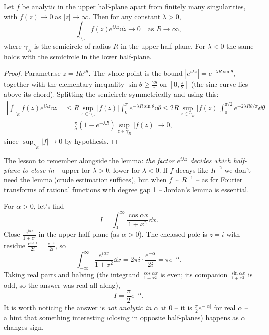 \documentclass[a4paper]{scrartcl}
\begin{document}
\begin{lemma}
	Let $f$ be analytic in the upper half-plane apart from finitely many singularities, with $f(z) \to 0$ as $|z| \to \infty$. Then for any constant $\lambda > 0$,
	$$
	\int_{\gamma_R} f(z) e^{i\lambda z} \dd z \to 0 \quad \text{as } R \to \infty,
	$$
	where $\gamma_R$ is the semicircle of radius $R$ in the upper half-plane. For $\lambda < 0$ the same holds with the semicircle in the lower half-plane.
\end{lemma}
\begin{proof}
	Parametrise $z = Re^{i\theta}$. The whole point is the bound $|e^{i\lambda z}| = e^{-\lambda R \sin\theta}$, together with the elementary inequality $\sin\theta \geq \frac{2\theta}{\pi}$ on $[0, \frac{\pi}{2}]$ (the sine curve lies above its chord). Splitting the semicircle symmetrically and using this:
	\begin{align*}
		\left|\int_{\gamma_R} f(z) e^{i\lambda z} \dd z\right|
		&\leq R \sup_{z \in \gamma_R}|f(z)| \int_0^\pi e^{-\lambda R \sin\theta} \dd\theta
		\leq 2R \sup_{z \in \gamma_R}|f(z)| \int_0^{\pi/2} e^{-2\lambda R\theta/\pi} \dd \theta \\
		&= \frac{\pi}{\lambda}\left(1 - e^{-\lambda R}\right) \sup_{z \in \gamma_R} |f(z)| \to 0,
	\end{align*}
	since $\sup_{\gamma_R} |f| \to 0$ by hypothesis.
\end{proof}

The lesson to remember alongside the lemma: \emph{the factor $e^{i\lambda z}$ decides which half-plane to close in} -- upper for $\lambda > 0$, lower for $\lambda < 0$. If $f$ decays like $R^{-2}$ we don't need the lemma (crude estimation suffices), but when $f \sim R^{-1}$ -- as for Fourier transforms of rational functions with degree gap 1 -- Jordan's lemma is essential.

\begin{example}
	For $\alpha > 0$, let's find
	$$
	I = \int_0^\infty \frac{\cos \alpha x}{1 + x^2} \dd x.
	$$
	Close $\frac{e^{i\alpha z}}{1 + z^2}$ in the upper half-plane (as $\alpha > 0$). The enclosed pole is $z = i$ with residue $\frac{e^{i\alpha \cdot i}}{2i} = \frac{e^{-\alpha}}{2i}$, so
	$$
	\int_{-\infty}^\infty \frac{e^{i\alpha x}}{1 + x^2} \dd x = 2\pi i \cdot \frac{e^{-\alpha}}{2i} = \pi e^{-\alpha}.
	$$
	Taking real parts and halving (the integrand $\frac{\cos \alpha x}{1+x^2}$ is even; its companion $\frac{\sin \alpha x}{1 + x^2}$ is odd, so the answer was real all along),
	$$
	I = \frac{\pi}{2} e^{-\alpha}.
	$$
	It is worth noticing the answer is \emph{not analytic in $\alpha$} at $0$ -- it is $\frac{\pi}{2}e^{-|\alpha|}$ for real $\alpha$ -- a hint that something interesting (closing in opposite half-planes) happens as $\alpha$ changes sign.
\end{example}
\end{document}

